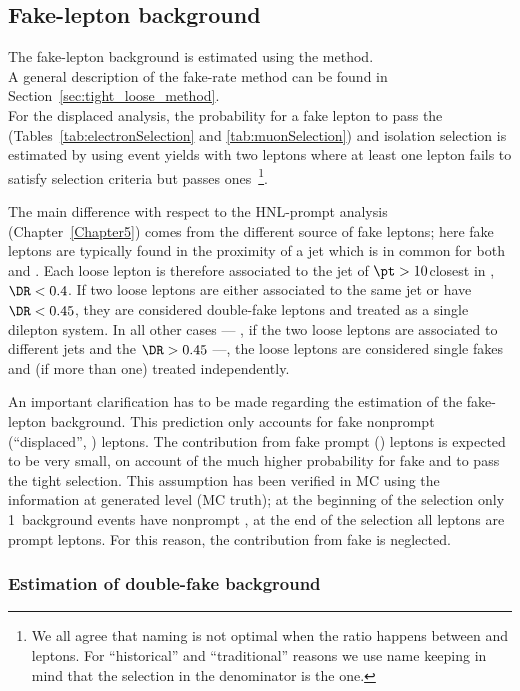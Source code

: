 \subsection{Fake-lepton background}\label{sec_llfakelepton}
The fake-lepton background is estimated using the \ttol
method.\\
A general description of the fake-rate method can be found in
Section~\ref{sec:tight_loose_method}.\\
For the displaced analysis, the probability for 
a fake lepton to pass the \tD (Tables~\ref{tab:electronSelection} and \ref{tab:muonSelection}) and isolation selection is estimated by using event yields with two leptons where at least one lepton fails to satisfy \tD 
selection criteria but passes
\fo ones~\footnote{We all agree that \ttol naming is not optimal when the
  ratio happens between \tD and \fo leptons. For ``historical'' and ``traditional''
  reasons we use \ttol name keeping in mind that the selection in the
  denominator is the \fo one.}.

The main difference with respect to the HNL-prompt analysis
(Chapter~\ref{Chapter5}) comes from the different source of fake
leptons; here fake leptons are typically found in the proximity of a
jet which is in common for both \ltwo and \lthree. Each loose
lepton is therefore associated to the jet of $\pt>10$\GeV closest in
\DR, \ie $\DR<0.4$.
If two loose leptons 
are either associated to the same jet or have $\DR<0.45$, they are considered double-fake
leptons and treated as a single dilepton system.
In all other cases --- \ie, if the two loose leptons are associated to
different jets and the $\DR>0.45$ ---,
the loose leptons are considered single fakes and (if more than one)
treated independently.

An important clarification has to be made regarding the estimation of 
the fake-lepton background. This prediction only accounts for fake
nonprompt (``displaced'', \ltwothree) leptons. The contribution from
fake prompt (\ie \lone) leptons is expected to be very small, on
account of the much higher probability for fake \ltwo and \lthree to
pass the tight \displ selection. This assumption has been verified in
MC using the information at generated level (MC truth); at the
beginning of the selection only 1\textperthousand\ background
events have nonprompt \lone, at the end of the selection all \lone
leptons are prompt leptons. 
For this reason, the contribution from fake \lone is neglected.

\subsubsection{Estimation of double-fake background}
\label{sec:doubleFakeBkg}

